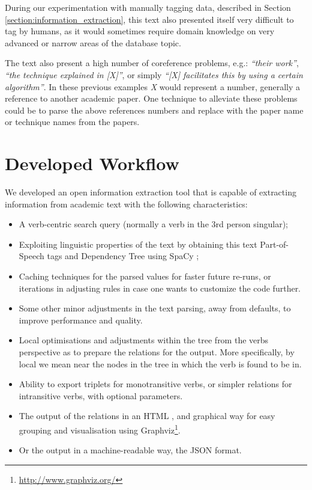 \documentclass[11pt,a4paper,openright]{memoir}
\begin{document}
During our experimentation with manually tagging data, described in Section \ref{section:information_extraction}, this text also presented itself very difficult to tag by humans, as it would sometimes require domain knowledge on very advanced or narrow areas of the database topic.

The text also present a high number of coreference problems, e.g.: \emph{\enquote{their work}}, \emph{\enquote{the technique explained in [X]}}, or simply \emph{\enquote{[X] facilitates this by using a certain algorithm}}. In these previous examples \emph{X} would represent a number, generally a reference to another academic paper. One technique to alleviate these problems could be to parse the above references numbers and replace with the paper name or technique names from the papers.



%
%
%
%


\chapter{Developed Workflow}
\label{chapter:developed}

We developed an open information extraction tool that is capable of extracting information from academic text with the following characteristics:
\begin{itemize}
	\item A verb-centric search query (normally a verb in the 3rd person singular);
	\item Exploiting linguistic properties of the text by obtaining this text Part-of-Speech tags and Dependency Tree using SpaCy \cite{honnibal-johnson:2015:EMNLP, spacy};
	\item Caching techniques for the parsed values for faster future re-runs, or iterations in adjusting rules in case one wants to customize the code further.
	\item Some other minor adjustments in the text parsing, away from defaults, to improve performance and quality.
	\item Local optimisations and adjustments within the tree from the verbs perspective as to prepare the relations for the output. More specifically, by local we mean near the nodes in the tree in which the verb is found to be in.
	\item Ability to export triplets for monotransitive verbs, or simpler relations for intransitive verbs, with optional parameters.
	\item The output of the relations in an HTML \cite{html}, and graphical way for easy grouping and visualisation using Graphviz\footnote{\url{http://www.graphviz.org/}}.
	\item Or the output in a machine-readable way, the JSON \cite{json} format.
\end{itemize}
\end{document}
